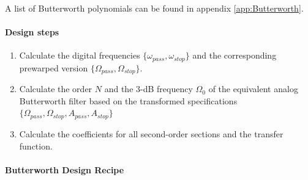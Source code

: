 A list of Butterworth polynomials can be found in appendix \ref{app:Butterworth}.

\paragraph{Design steps}
\begin{enumerate}
	\item Calculate the digital frequencies $\{\omega_{pass}, \omega_{stop}\}$
	and the corresponding prewarped version $\{\Omega_{pass}, \Omega_{stop}\}$.
	\item Calculate the order $N$ and the 3-dB frequency $\Omega_0$ of the
	 equivalent analog Butterworth filter based on the transformed specifications
	 $\{\Omega_{pass}, \Omega_{stop}, A_{pass}, A_{stop} \}$
	\item Calculate the coefficients for all second-order sections and the transfer function.
\end{enumerate}

\paragraph{Butterworth Design Recipe}

